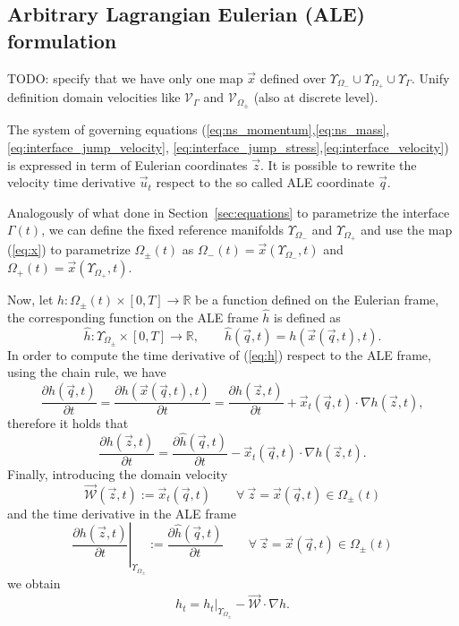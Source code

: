 \documentclass[a4paper,12pt,onecolumn]{article}
\begin{document}
\subsection{Arbitrary Lagrangian Eulerian (ALE) formulation}\label{sec:ale}
TODO: specify that we have only one map $\vec x$ defined over
$\Upsilon_{\Omega_-}\cup\Upsilon_{\Omega_+}\cup\Upsilon_{\Gamma}$. Unify
definition domain velocities like $\mathcal{V}_\Gamma$ and
$\mathcal{V}_{\Omega_\pm}$ (also at discrete level).

The system of governing equations
(\ref{eq:ns_momentum},\ref{eq:ns_mass},\ref{eq:interface_jump_velocity},
\ref{eq:interface_jump_stress},\ref{eq:interface_velocity}) is expressed in
term of Eulerian coordinates $\vec z$. It is possible to rewrite the velocity
time derivative $\vec u_t$ respect to the so called ALE coordinate $\vec q$.

Analogously of what done in Section~\ref{sec:equations} to parametrize the
interface $\Gamma(t)$, we can define the fixed reference manifolds
$\Upsilon_{\Omega_-}$ and $\Upsilon_{\Omega_+}$ and use the map
(\ref{eq:x}) to parametrize $\Omega_\pm(t)$ as
$\Omega_-(t)=\vec x(\Upsilon_{\Omega_-},t)$ and $\Omega_+(t)=\vec
x(\Upsilon_{\Omega_+},t)$.

Now, let $h:\Omega_{\pm}(t)\times [0,T]\to \mathbb{R}$ be a function defined on
the Eulerian frame, the corresponding function on the ALE frame $\hat h$ is
defined as
\begin{equation}\label{eq:h}
\hat h:\Upsilon_{\Omega_\pm}\times [0,T]\to \mathbb{R},\qquad
\hat h(\vec q,t)=h(\vec{x}(\vec q,t),t).
\end{equation}
In order to compute the time derivative of (\ref{eq:h}) respect to the ALE
frame, using the chain rule, we have
\begin{equation}
\frac{\partial\hat h(\vec q,t)}{\partial t}=\frac{\partial h(\vec x(\vec
q,t),t)}{\partial t}=\frac{\partial h(\vec z,t)}{\partial t}+\vec x_t(\vec q,t)
\cdot \nabla h(\vec z,t),
\end{equation}
therefore it holds that
\begin{equation}
\frac{\partial h(\vec z,t)}{\partial t} =
\frac{\partial\hat h(\vec q,t)}{\partial t}-
\vec x_t(\vec q,t) \cdot \nabla h(\vec z,t).
\end{equation}
Finally, introducing the domain velocity
\begin{equation} \label{eq:W}
\vec{\mathcal{W}}(\vec z, t) := \vec x_t(\vec q, t) \qquad
\forall\ \vec z = \vec x(\vec q,t) \in \Omega_\pm(t)
\end{equation}
and the time derivative in the ALE frame
\begin{equation} \label{eq:ale_derivative}
\left.\frac{\partial h(\vec z,t)}{\partial t}\right|_{\Upsilon_{\Omega_\pm}}:=
\frac{\partial\hat h(\vec q,t)}{\partial t} \qquad
\forall\ \vec z = \vec x(\vec q,t) \in \Omega_\pm(t)
\end{equation}
we obtain
\begin{equation}\label{eq:ale_dt}
h_t =\left.h_t\right|_{\Upsilon_{\Omega_\pm}} -\vec{\mathcal{W}} \cdot \nabla h.
\end{equation}
\end{document}
